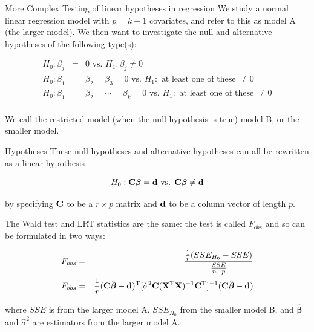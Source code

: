 \documentclass[
  ignorenonframetext,
]{beamer}
\begin{document}
\begin{frame}{More Complex Testing of linear hypotheses in regression}
\label{more-complex-testing-of-linear-hypotheses-in-regression}
We study a normal linear regression model with \(p=k+1\) covariates, and
refer to this as model A (the larger model). We then want to investigate
the null and alternative hypotheses of the following type(s):

\begin{eqnarray*}
 H_0: \beta_{j}&=&0 \text{ vs. } H_1:\beta_j\neq 0\\
 H_0: \beta_{1}&=&\beta_{2}=\beta_{3}=0 \text{ vs. } H_1:\text{ at least one of these }\neq 0\\
 H_0: \beta_{1}&=&\beta_{2}=\cdots=\beta_{k}=0 \text{ vs. } H_1:\text{ at least one of these }\neq 0\\
 \end{eqnarray*}

We call the restricted model (when the null hypothesis is true) model B,
or the smaller model.
\end{frame}

\begin{frame}{Hypotheses}
\label{hypotheses}
These null hypotheses and alternative hypotheses can all be rewritten as
a linear hypothesis

\[
H_0: {\bf C}{\boldsymbol \beta}={\bf d} \text{ vs. } {\bf C}{\boldsymbol \beta}\neq {\bf d}
\]

by specifying \({\bf C}\) to be a \(r \times p\) matrix and \({\bf d}\)
to be a column vector of length \(p\).

The Wald test and LRT statistics are the same: the test is called
\(F_{obs}\) and so can be formulated in two ways:

\begin{eqnarray}
F_{obs}&=&\frac{\frac{1}{r} (SSE_{H_0}-SSE)}{\frac{SSE}{n-p}} \label{Fobsnested}\\
F_{obs}&=&\frac{1}{r}({\bf C}\hat{ {\boldsymbol \beta}}-{\bf d})^{\text T}[\hat{\sigma}^2 {\bf C}({\bf X}^{\text T}{\bf X})^{-1}{\bf C}^{\text T}]^{-1}({\bf C}\hat{ {\boldsymbol \beta}}-{\bf d}) \label{FobsCbeta}
\end{eqnarray}

where \(SSE\) is from the larger model A, \(SSE_{H_0}\) from the smaller
model B, and \(\hat{ {\boldsymbol \beta}}\) and \(\hat{\sigma}^2\) are
estimators from the larger model A.
\end{frame}
\end{document}
